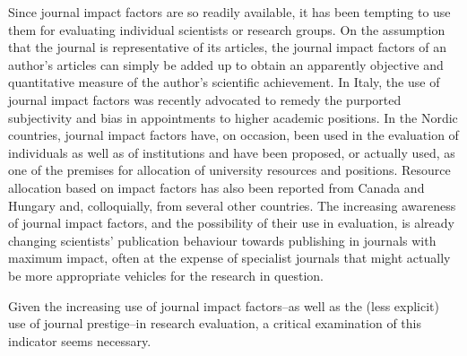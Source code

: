 \documentclass[11pt, a4paper]{article}
\begin{document}
Since journal impact factors are so readily available, it has been tempting to use them for
evaluating individual scientists or research groups. On the assumption that the journal is
representative of its articles, the journal impact factors of an author's articles can simply be
added up to obtain an apparently objective and quantitative measure of the author's scientific
achievement. In Italy, the use of journal impact factors was recently advocated to remedy the
purported subjectivity and bias in appointments to higher academic positions.
In the Nordic countries, journal impact factors have, on occasion, been used in the evaluation
of individuals as well as of institutions and have been proposed, or actually used, as one of
the premises for allocation of university resources and positions.
Resource allocation based on impact factors has also been reported from Canada and Hungary and,
colloquially, from several other countries. The increasing awareness of journal impact factors,
and the possibility of their use in evaluation, is already changing scientists' publication
behaviour towards publishing in journals with maximum impact, often at the expense of
specialist journals that might actually be more appropriate vehicles for the research in question.

Given the increasing use of journal impact factors–as well as the (less explicit) use of
journal prestige–in research evaluation, a critical examination of this indicator seems necessary.
\end{document}
